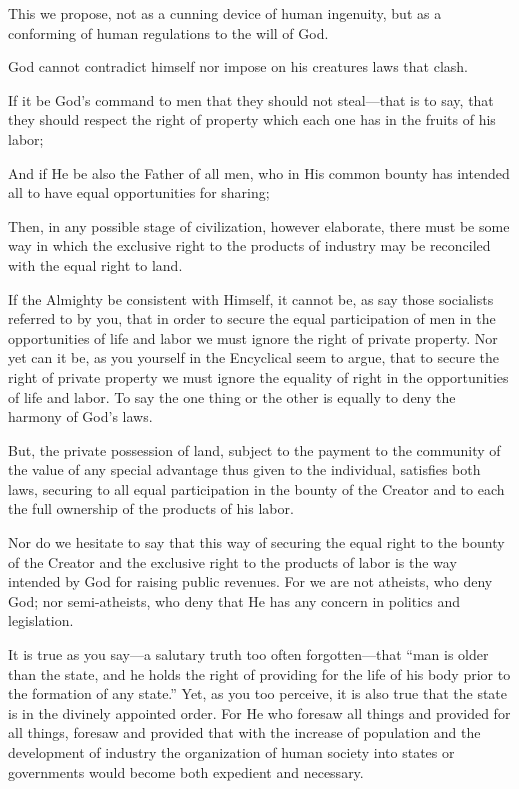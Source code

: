 \documentclass{book}
\begin{document}
This we propose, not as a cunning device of human ingenuity, but as a conforming of human regulations to the will of God.

God cannot contradict himself nor impose on his creatures laws that clash.

If it be God’s command to men that they should not steal—that is to say, that they should respect the right of property which each one has in the fruits of his labor;

And if He be also the Father of all men, who in His common bounty has intended all to have equal opportunities for sharing;

Then, in any possible stage of civilization, however elaborate, there must be some way in which the exclusive right to the products of industry may be reconciled with the equal right to land.

If the Almighty be consistent with Himself, it cannot be, as say those socialists referred to by you, that in order to secure the equal participation of men in the opportunities of life and labor we must ignore the right of private property. Nor yet can it be, as you yourself in the Encyclical seem to argue, that to secure the right of private property we must ignore the equality of right in the opportunities of life and labor. To say the one thing or the other is equally to deny the harmony of God’s laws.

But, the private possession of land, subject to the payment to the community of the value of any special advantage thus given to the individual, satisfies both laws, securing to all equal participation in the bounty of the Creator and to each the full ownership of the products of his labor.

Nor do we hesitate to say that this way of securing the equal right to the bounty of the Creator and the exclusive right to the products of labor is the way intended by God for raising public revenues. For we are not atheists, who deny God; nor semi-atheists, who deny that He has any concern in politics and legislation.

It is true as you say—a salutary truth too often forgotten—that “man is older than the state, and he holds the right of providing for the life of his body prior to the formation of any state.” Yet, as you too perceive, it is also true that the state is in the divinely appointed order. For He who foresaw all things and provided for all things, foresaw and provided that with the increase of population and the development of industry the organization of human society into states or governments would become both expedient and necessary.
\end{document}
